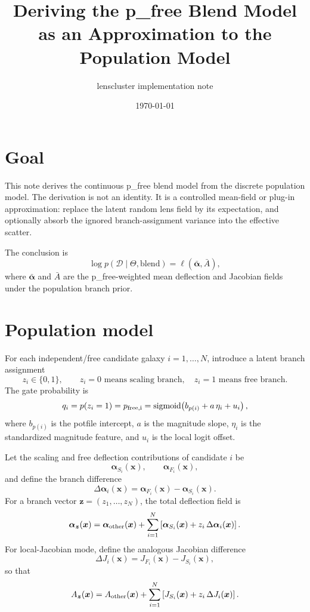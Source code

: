 \documentclass[11pt]{article}
\title{Deriving the p\_free Blend Model as an Approximation to the Population Model}
\author{lenscluster implementation note}
\date{\today}
\newcommand{\data}{\mathcal{D}}
\newcommand{\sigmoid}{\operatorname{sigmoid}}
\begin{document}
\maketitle

\section{Goal}

This note derives the continuous p\_free blend model from the discrete
population model. The derivation is not an identity. It is a controlled
mean-field or plug-in approximation: replace the latent random lens field by
its expectation, and optionally absorb the ignored branch-assignment variance
into the effective scatter.

The conclusion is
\[
    \log p(\data\mid\Theta,\text{blend})
    =
    \ell\!\left(\bar{\bm{\alpha}},\bar{A}\right),
\]
where $\bar{\bm{\alpha}}$ and $\bar{A}$ are the p\_free-weighted mean
deflection and Jacobian fields under the population branch prior.

\section{Population model}

For each independent/free candidate galaxy $i=1,\ldots,N$, introduce a latent
branch assignment
\[
    z_i \in \{0,1\},
    \qquad
    z_i=0 \text{ means scaling branch},\quad
    z_i=1 \text{ means free branch}.
\]
The gate probability is
\[
    q_i
    =
    p(z_i=1)
    =
    p_{\rm free,i}
    =
    \sigmoid\!\left(b_{p(i)}+a\,\eta_i+u_i\right),
\]
where $b_{p(i)}$ is the potfile intercept, $a$ is the magnitude slope,
$\eta_i$ is the standardized magnitude feature, and $u_i$ is the local logit
offset.

Let the scaling and free deflection contributions of candidate $i$ be
\[
    \bm{\alpha}_{S_i}(\bm{x}),
    \qquad
    \bm{\alpha}_{F_i}(\bm{x}),
\]
and define the branch difference
\[
    \Delta\bm{\alpha}_i(\bm{x})
    =
    \bm{\alpha}_{F_i}(\bm{x})-\bm{\alpha}_{S_i}(\bm{x}).
\]
For a branch vector $\bm{z}=(z_1,\ldots,z_N)$, the total deflection field is
\[
    \bm{\alpha}_{\bm{z}}(\bm{x})
    =
    \bm{\alpha}_{\rm other}(\bm{x})
    +
    \sum_{i=1}^N
    \left[
        \bm{\alpha}_{S_i}(\bm{x})
        +
        z_i\,\Delta\bm{\alpha}_i(\bm{x})
    \right].
\]
For local-Jacobian mode, define the analogous Jacobian difference
\[
    \Delta J_i(\bm{x})
    =
    J_{F_i}(\bm{x})-J_{S_i}(\bm{x}),
\]
so that
\[
    A_{\bm{z}}(\bm{x})
    =
    A_{\rm other}(\bm{x})
    +
    \sum_{i=1}^N
    \left[
        J_{S_i}(\bm{x})
        +
        z_i\,\Delta J_i(\bm{x})
    \right].
\]
\end{document}
